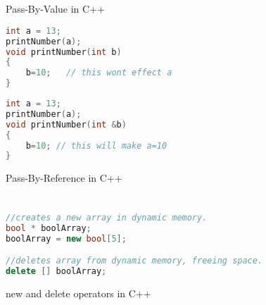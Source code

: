 \documentclass[]{report}
\begin{document}
\chapter{}
\begin{figure}[h!]
	\caption{Pass-By-Value in C++}
	\begin{lstlisting}[language=C++,frame=single]
int a = 13;
printNumber(a);
void printNumber(int b)
{
	b=10;	// this wont effect a
}
	\end{lstlisting}
	\caption{Pass-By-Reference in C++}
	\begin{lstlisting}[language=C++,frame=single]
int a = 13;
printNumber(a);
void printNumber(int &b)
{
	b=10; // this will make a=10
}
	\end{lstlisting}
\end{figure}

\chapter{}
\begin{figure}[h!]
	\caption{new and delete operators in C++}
	\begin{lstlisting}[language=C++,frame=single]
//creates a new array in dynamic memory.
bool * boolArray;
boolArray = new bool[5]; 

//deletes array from dynamic memory, freeing space.
delete [] boolArray; 
	\end{lstlisting}
\end{figure}
\end{document}

